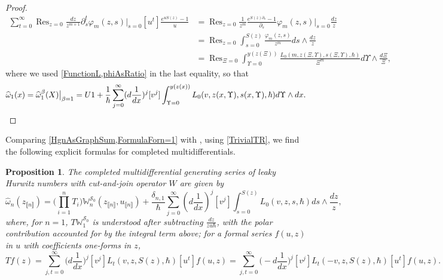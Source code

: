 \documentclass[10pt,a4paper,oneside,no-math,reqno]{amsart}%
\theoremstyle{plain}
\newtheorem{proposition}[theorem]{Proposition}
\theoremstyle{definition}
\theoremstyle{remark}
\numberwithin{equation}{section}
\renewcommand{\phi}{\varphi}
\newcommand{\mb}[1]{\mathbb{#1}}
\newcommand{\mc}[1]{\mathcal{#1}}
\newcommand{\1}{\mathds{1}}
\newcommand{\<}{\langle}
\renewcommand{\>}{\rangle}
\newcommand{\del}{\partial}
\DeclareMathOperator*{\Res}{Res}
\begin{document}
\begin{proof}
	\begin{equation}
		\begin{split}
			\sum_{t=0}^\infty \Res_{z=0} \frac{dz}{z^{m+1}} \del_s^t \phi_m(z,s )\Big|_{s = 0} [u^t ] \frac{e^{u S(z)} - 1}{u}
			&=
			\Res_{z=0} \frac{1}{z^m} \frac{e^{S(z) \del_s} - 1}{\del_s} \phi_m (z,s) \Big|_{s=0} \frac{dz}{z}
			\\
			&=
			\Res_{z=0} \int_{s=0}^{S(z)} \frac{\phi_m ( z,s )}{z^m} ds \wedge \frac{dz}{z}
			\\
			&=
			\Res_{\Xi = 0} \int_{\Upsilon=0}^{y(z(\Xi))} \frac{L_0(m,z(\Xi,\Upsilon), s(\Xi,\Upsilon),\hbar)}{\Xi^m} d\Upsilon \wedge \frac{d\Xi}{\Xi},
		\end{split}
	\end{equation}
	where we used \cref{FunctionL,phiAsRatio} in the last equality, so that
	\begin{equation*}
			\widehat{\omega}_1 (x)
            =
            \widehat{\omega}_1^\beta (X) \big|_{\beta = 1}
			=
			U 1 + \frac{1}{\hbar}\sum_{j=0}^\infty (d \frac{1}{dx})^j [v^j] \int_{\Upsilon=0}^{y(z(x))} L_0(v, z(x,\Upsilon), s(x,\Upsilon),\hbar) d\Upsilon \wedge dx .
			\qedhere
	\end{equation*}
\end{proof}

Comparing \cref{HgnAsGraphSum,FormulaForn=1} with \cite[Proof of proposition 4.4]{ABDKS24}, using \cref{TrivialTR}, we find the following explicit formulas for completed multidifferentials.

\begin{proposition}\label{LeakyMultidifferentials}
	The completed multidifferential generating series of leaky Hurwitz numbers with cut-and-join operator $W$ are given by
	\begin{equation}
		\widehat{\omega}_n (z_{\llbracket n\rrbracket})
		=
		\Big( \prod_{i=1}^n T_i \Big)
		\mb{W}_n^{\mc{S}_0} (z_{\llbracket n\rrbracket}, u_{\llbracket n\rrbracket}) 
		+
		\frac{\delta_{n,1}}{\hbar} \sum_{j=0}^\infty ( d \frac{1}{dx} )^j [v^j] \int_{s = 0}^{S(z)} L_0 (v, z, s, \hbar) ds \wedge \frac{dz}{z},
	\end{equation}
	where, for $n=1$, $T\mb{W}^{\mc{S}_0}_1$ is understood after subtracting $\frac{dz}{zu\hbar}$, with the polar contribution accounted for by the integral term above; for a formal series $ f(u,z) $ in $u$ with coefficients one-forms in $ z$,
	\begin{equation}
		Tf (z)
		=
		\sum_{j,t = 0}^\infty \big(d \frac{1}{dx}\big)^j  [v^j] L_t(v, z, S(z), \hbar) [u^t] f(u,z)
		=
		\sum_{j,t = 0}^\infty \big(- d \frac{1}{dx}\big)^j  [v^j] L_t(-v, z, S(z), \hbar) [u^t] f(u,z) .
	\end{equation}
\end{proposition}
\end{document}
